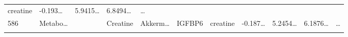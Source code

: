 \documentclass[
]{article}
\begin{document}
\begin{longtable}[]{@{}lllllllllll@{}}
\begin{minipage}[t]{0.09\columnwidth}
creatine\strut
\end{minipage} & \begin{minipage}[t]{0.07\columnwidth}\raggedright
-0.193\ldots{}\strut
\end{minipage} & \begin{minipage}[t]{0.07\columnwidth}\raggedright
5.9415\ldots{}\strut
\end{minipage} & \begin{minipage}[t]{0.07\columnwidth}\raggedright
6.8494\ldots{}\strut
\end{minipage} & \begin{minipage}[t]{0.03\columnwidth}\raggedright
\ldots{}\strut
\end{minipage}\tabularnewline
\begin{minipage}[t]{0.03\columnwidth}\raggedright
586\strut
\end{minipage} & \begin{minipage}[t]{0.07\columnwidth}\raggedright
Metabo\ldots{}\strut
\end{minipage} & \begin{minipage}[t]{0.07\columnwidth}\raggedright
\strut
\end{minipage} & \begin{minipage}[t]{0.09\columnwidth}\raggedright
Creatine\strut
\end{minipage} & \begin{minipage}[t]{0.07\columnwidth}\raggedright
Akkerm\ldots{}\strut
\end{minipage} & \begin{minipage}[t]{0.07\columnwidth}\raggedright
IGFBP6\strut
\end{minipage} & \begin{minipage}[t]{0.09\columnwidth}\raggedright
creatine\strut
\end{minipage} & \begin{minipage}[t]{0.07\columnwidth}\raggedright
-0.187\ldots{}\strut
\end{minipage} & \begin{minipage}[t]{0.07\columnwidth}\raggedright
5.2454\ldots{}\strut
\end{minipage} & \begin{minipage}[t]{0.07\columnwidth}\raggedright
6.1876\ldots{}\strut
\end{minipage} & \begin{minipage}[t]{0.03\columnwidth}\raggedright
\ldots{}\strut
\end{minipage}\tabularnewline
\begin{minipage}[t]{0.03\columnwidth}\raggedright

\end{minipage}
\end{longtable}
\end{document}
